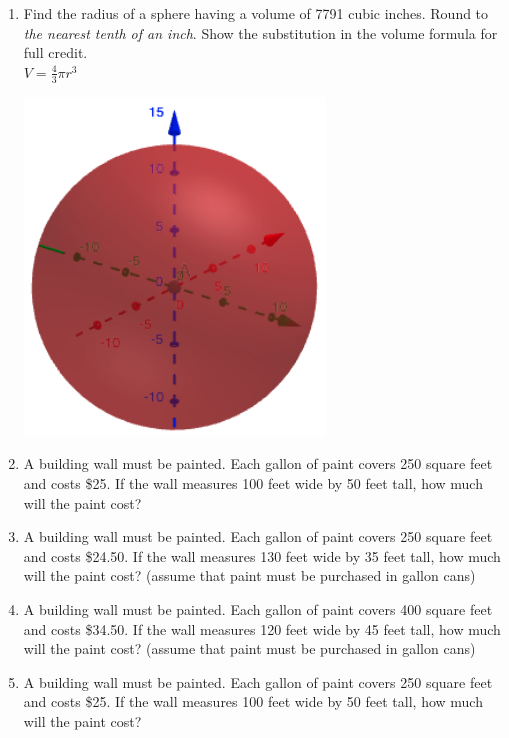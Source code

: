 \begin{enumerate}
\item Find the radius of a sphere having a volume of 7791 cubic inches. Round to \emph{the nearest tenth of an inch}. Show the substitution in the volume formula for full credit. \\[0.5cm]
$\displaystyle V = \frac{4}{3} \pi r^3$
  \begin{flushright}
    \includegraphics[width=8cm]{../graphics/04sphere.png}
  \end{flushright}

\item A building wall must be painted. Each gallon of paint covers 250 square feet and costs \$25. If the wall measures 100 feet wide by 50 feet tall, how much will the paint cost?

\item A building wall must be painted. Each gallon of paint covers 250 square feet and costs \$24.50. If the wall measures 130 feet wide by 35 feet tall, how much will the paint cost? (assume that paint must be purchased in gallon cans)

\item A building wall must be painted. Each gallon of paint covers 400 square feet and costs \$34.50. If the wall measures 120 feet wide by 45 feet tall, how much will the paint cost? (assume that paint must be purchased in gallon cans)

\item A building wall must be painted. Each gallon of paint covers 250 square feet and costs \$25. If the wall measures 100 feet wide by 50 feet tall, how much will the paint cost?

\end{enumerate}
